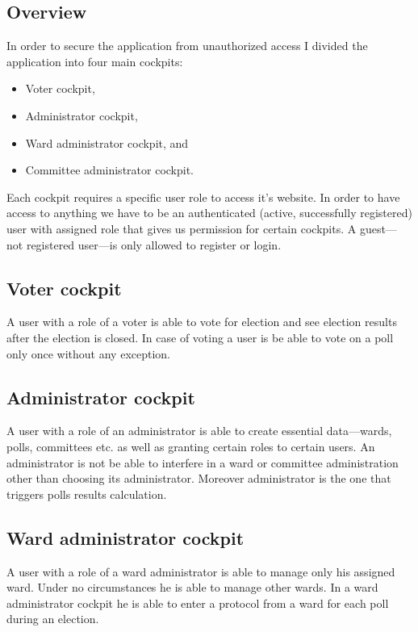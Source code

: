 \documentclass[a4paper,twoside,12pt]{book}
\begin{document}
    \subsection{Overview}
    In order to secure the application from unauthorized access  I divided the application into four main cockpits:
    \begin{itemize}
      \item Voter cockpit,
      \item Administrator cockpit,
      \item Ward administrator cockpit, and
      \item Committee administrator cockpit.
    \end{itemize}
    Each cockpit requires a specific user role to access it's website.
    In order to have access to anything we have to be an authenticated (active, successfully registered) user with assigned role that gives us permission for certain cockpits.
    A guest---not registered user---is only allowed to register or login.

    \subsection{Voter cockpit}
    \label{subsec:voter_cockpit}
    A user with a role of a voter is able to vote for election and see election results after the election is closed.
    In case of voting a user is be able to vote on a poll only once without any exception.

    \subsection{Administrator cockpit}
    A user with a role of an administrator is able to create essential data---wards, polls, committees etc. as well as granting certain roles to certain users.
    An administrator is not be able to interfere in a ward or committee administration other than choosing its administrator.
    Moreover administrator is the one that triggers polls results calculation.

    \subsection{Ward administrator cockpit}
    A user with a role of a ward administrator is able to manage only his assigned ward. Under no circumstances he is able to manage other wards.
    In a ward administrator cockpit he is able to enter a  protocol from a ward for each poll during an election.
\end{document}
